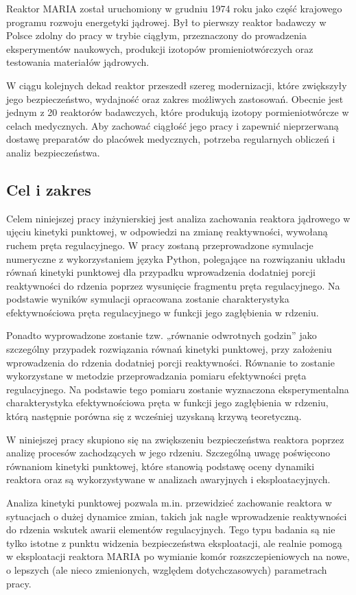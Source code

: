 	Reaktor MARIA został uruchomiony w grudniu 1974 roku jako część krajowego programu rozwoju energetyki jądrowej. Był to pierwszy reaktor badawczy w Polsce zdolny do pracy w trybie ciągłym, przeznaczony do prowadzenia eksperymentów naukowych, produkcji izotopów promieniotwórczych oraz testowania materiałów jądrowych. 
	
	W ciągu kolejnych dekad reaktor przeszedł szereg modernizacji, które zwiększyły jego bezpieczeństwo, wydajność oraz zakres możliwych zastosowań. Obecnie jest jednym z 20 reaktorów badawczych, które produkują izotopy pormieniotwórcze w celach medycznych. Aby zachować ciągłość jego pracy i zapewnić nieprzerwaną dostawę preparatów do placówek medycznych, potrzeba regularnych obliczeń i analiz bezpieczeństwa.
	\subsection	{Cel i zakres}
	
	
	Celem niniejszej pracy inżynierskiej jest analiza zachowania reaktora jądrowego w ujęciu kinetyki punktowej, w odpowiedzi na zmianę reaktywności, wywołaną ruchem pręta regulacyjnego.
	W pracy zostaną przeprowadzone symulacje numeryczne z wykorzystaniem języka Python, polegające na rozwiązaniu układu równań kinetyki punktowej dla przypadku wprowadzenia dodatniej porcji reaktywności do rdzenia poprzez wysunięcie fragmentu pręta regulacyjnego.
	Na podstawie wyników symulacji opracowana zostanie charakterystyka efektywnościowa pręta regulacyjnego w funkcji jego zagłębienia w rdzeniu.
	
	Ponadto wyprowadzone zostanie tzw. „równanie odwrotnych godzin” jako szczególny przypadek rozwiązania równań kinetyki punktowej, przy założeniu wprowadzenia do rdzenia dodatniej porcji reaktywności. Równanie to zostanie wykorzystane w metodzie przeprowadzania pomiaru efektywności pręta regulacyjnego.
	Na podstawie tego pomiaru zostanie wyznaczona eksperymentalna charakterystyka efektywnościowa pręta w funkcji jego zagłębienia w rdzeniu, którą następnie porówna się z wcześniej uzyskaną krzywą teoretyczną.
	
	W niniejszej pracy skupiono się na zwiększeniu bezpieczeństwa reaktora poprzez analizę procesów zachodzących w jego rdzeniu. Szczególną uwagę poświęcono równaniom kinetyki punktowej, które stanowią podstawę oceny dynamiki reaktora oraz są wykorzystywane w analizach awaryjnych i eksploatacyjnych.
	
	Analiza kinetyki punktowej pozwala m.in. przewidzieć zachowanie reaktora w sytuacjach o dużej dynamice zmian, takich jak nagłe wprowadzenie reaktywności do rdzenia wskutek awarii elementów regulacyjnych. Tego typu badania są nie tylko istotne z punktu widzenia bezpieczeństwa eksploatacji, ale realnie pomogą w eksploatacji reaktora MARIA po wymianie komór rozszczepieniowych na nowe, o lepszych (ale nieco zmienionych, względem dotychczasowych) parametrach pracy.
